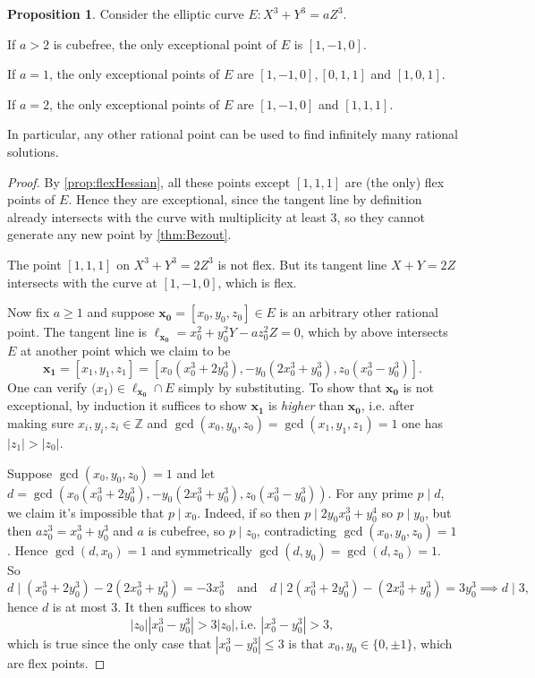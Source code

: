 \documentclass{article}
\newcommand{\Z}{\mathbb{Z}}
\theoremstyle{definition}
\newtheorem{prop}[defn]{Proposition}
\begin{document}
\begin{prop}
Consider the elliptic curve $E:X^3+Y^3=aZ^3$.

If $a>2$ is cubefree, the only exceptional point of $E$ is $[1,-1,0]$.

If $a=1$, the only exceptional points of $E$ are $[1,-1,0],[0,1,1]$ and $[1,0,1]$.

If $a=2$, the only exceptional points of $E$ are $[1,-1,0]$ and $[1,1,1]$.

In particular, any other rational point can be used to find infinitely many rational solutions.
\end{prop}
\begin{proof}
By \ref{prop:flexHessian}, all these points except $[1,1,1]$ are (the only) flex points of $E$. Hence they are exceptional, since the tangent line by definition already intersects with the curve with multiplicity at least 3, so they cannot generate any new point by \ref{thm:Bezout}.

The point $[1,1,1]$ on $X^3+Y^3=2Z^3$ is not flex. But its tangent line $X+Y=2Z$ intersects with the curve at $[1,-1,0]$, which is flex.

Now fix $a\geq 1$ and suppose $\mathbf{x_0}=[x_0,y_0,z_0]\in E$ is an arbitrary other rational point. The tangent line is $\ell_{\mathbf{x_0}}=x_0^2+y_0^2Y-az_0^2Z=0$, which by above intersects $E$ at another point which we claim to be
\[
\mathbf{x_1}=[x_1,y_1,z_1]=[x_0(x_0^3+2y_0^3),-y_0(2x_0^3+y_0^3),z_0(x_0^3-y_0^3)].
\]
One can verify $\mathbf(x_1)\in\ell_{\mathbf{x_0}}\cap E$ simply by substituting. To show that $\mathbf{x_0}$ is not exceptional, by induction it suffices to show $\mathbf{x_1}$ is \textit{higher} than $\mathbf{x_0}$, i.e. after making sure $x_i,y_i,z_i\in\Z$ and $\gcd(x_0,y_0,z_0)=\gcd(x_1,y_1,z_1)=1$ one has $|z_1|>|z_0|$.

Suppose $\gcd(x_0,y_0,z_0)=1$ and let $d=\gcd(x_0(x_0^3+2y_0^3),-y_0(2x_0^3+y_0^3),z_0(x_0^3-y_0^3))$. For any prime $p\mid d$, we claim it's impossible that $p\mid x_0$. Indeed, if so then $p\mid 2y_0x_0^3+y_0^4$ so $p\mid y_0$, but then $az_0^3=x_0^3+y_0^3$ and $a$ is cubefree, so $p\mid z_0$, contradicting $\gcd(x_0,y_0,z_0)=1$. Hence $\gcd(d,x_0)=1$ and symmetrically $\gcd(d,y_0)=\gcd(d,z_0)=1$. So
\[
d\mid (x_0^3+2y_0^3)-2(2x_0^3+y_0^3)=-3x_0^3\quad\text{and}\quad d\mid 2(x_0^3+2y_0^3)-(2x_0^3+y_0^3)=3y_0^3\implies d\mid 3,
\]
hence $d$ is at most 3. It then suffices to show
\[
|z_0||x_0^3-y_0^3|>3|z_0|,\text{i.e. }|x_0^3-y_0^3|>3,
\]
which is true since the only case that $|x_0^3-y_0^3|\leq 3$ is that $x_0,y_0\in\{0,\pm 1\}$, which are flex points.
\end{proof}
\end{document}
